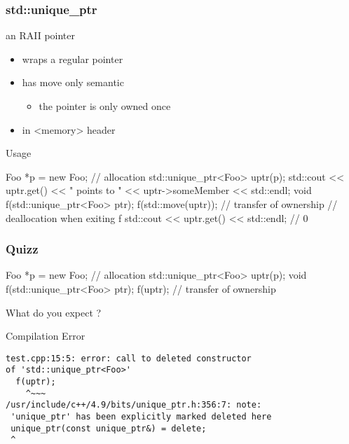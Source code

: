 \begin{frame}[fragile]
  \frametitle{std::unique\_ptr}
  \begin{block}{an RAII pointer}
    \begin{itemize}
    \item wraps a regular pointer
    \item has move only semantic
      \begin{itemize}
      \item the pointer is only owned once
      \end{itemize}
    \item in \textless{}memory\textgreater{} header
    \end{itemize}
  \end{block}
  \pause
  \begin{exampleblock}{Usage}
    \begin{cppcode*}{}
      Foo *p = new Foo{};  // allocation
      std::unique_ptr<Foo> uptr(p);
      std::cout << uptr.get() << " points to "
                << uptr->someMember << std::endl;
      void f(std::unique_ptr<Foo> ptr);
      f(std::move(uptr)); // transfer of ownership
      // deallocation when exiting f
      std::cout << uptr.get() << std::endl; // 0
    \end{cppcode*}
  \end{exampleblock}
\end{frame}

\begin{frame}[fragile]
  \frametitle{Quizz}
  \begin{exampleblock}{}
    \begin{cppcode*}{}
      Foo *p = new Foo{};  // allocation
      std::unique_ptr<Foo> uptr(p);
      void f(std::unique_ptr<Foo> ptr);
      f(uptr); // transfer of ownership
    \end{cppcode*}
    What do you expect ?
  \end{exampleblock}
  \pause
  \begin{alertblock}{Compilation Error}
    \begin{verbatim}
test.cpp:15:5: error: call to deleted constructor
of 'std::unique_ptr<Foo>'
  f(uptr);
    ^~~~
/usr/include/c++/4.9/bits/unique_ptr.h:356:7: note: 
 'unique_ptr' has been explicitly marked deleted here
 unique_ptr(const unique_ptr&) = delete;
 ^
    \end{verbatim}
  \end{alertblock}
\end{frame}

